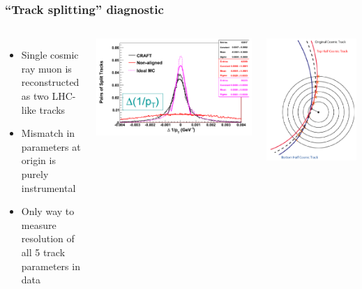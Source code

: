\documentclass[compress]{beamer}
\begin{document}
\begin{frame}
\frametitle{``Track splitting'' diagnostic}

\begin{columns}
\begin{itemize}
\item Single cosmic ray muon is reconstructed as two LHC-like tracks
\item Mismatch in parameters at origin is purely instrumental
\item Only way to measure resolution of all 5 track parameters in data
\end{itemize}

\includegraphics[width=\linewidth]{track_splitting.png}

\includegraphics[width=\linewidth]{track_splitting_diagram.png}
\end{columns}


\end{frame}
\end{document}
